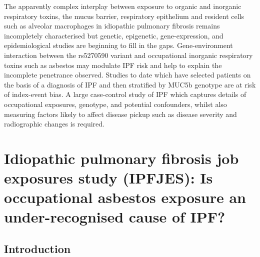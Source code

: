 \documentclass[
]{article}
\begin{document}
The apparently complex interplay between exposure to organic and
inorganic respiratory toxins, the mucus barrier, respiratory epithelium
and resident cells such as alveolar macrophages in idiopathic pulmonary
fibrosis remains incompletely characterised but genetic, epigenetic,
gene-expression, and epidemiological studies are beginning to fill in
the gaps. Gene-environment interaction between the rs5270590 variant and
occupational inorganic respiratory toxins such as asbestos may modulate
IPF risk and help to explain the incomplete penetrance observed. Studies
to date which have selected patients on the basis of a diagnosis of IPF
and then stratified by MUC5b genotype are at risk of index-event bias. A
large case-control study of IPF which captures details of occupational
exposures, genotype, and potential confounders, whilst also measuring
factors likely to affect disease pickup such as disease severity and
radiographic changes is required.

\hypertarget{idiopathic-pulmonary-fibrosis-job-exposures-study-ipfjes-is-occupational-asbestos-exposure-an-under-recognised-cause-of-ipf}{%
\section{Idiopathic pulmonary fibrosis job exposures study (IPFJES): Is
occupational asbestos exposure an under-recognised cause of
IPF?}\label{idiopathic-pulmonary-fibrosis-job-exposures-study-ipfjes-is-occupational-asbestos-exposure-an-under-recognised-cause-of-ipf}}

\hypertarget{introduction-4}{%
\subsection{Introduction}\label{introduction-4}}
\end{document}
